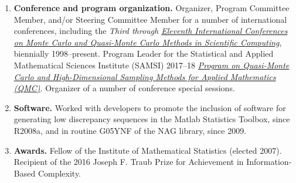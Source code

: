 \documentclass[11 pt]{NSFamsart}
\newcommand{\Matlab}{{\sc Matlab}\xspace}
\begin{document}
\begin{enumerate}
		\item \textbf{Conference and program organization.} Organizer, Program Committee Member, and/or Steering Committee Member for a number of international conferences, including the {\em Third through \href{http://mcqmc2018.inria.fr}{Eleventh
		International Conferences on Monte Carlo and
		Quasi-Monte Carlo Methods in Scientific Computing}}, biennially 1998--present.  Program 
		Leader for the Statistical and Applied Mathematical Sciences Institute (SAMSI) 
	2017--18 
	\href{https://www.samsi.info/programs-and-activities/year-long-research-programs/2017-18-program-quasi-monte-carlo-high-dimensional-sampling-methods-applied-mathematics-qmc/
		}{\emph{Program on Quasi-Monte Carlo and High-Dimensional Sampling Methods for Applied 
		Mathematics (QMC)}}.  Organizer of a number of conference special sessions.

		
		
		\item \textbf{Software.} Worked with developers to promote the inclusion of software for generating low 
		discrepancy sequences in the \Matlab Statistics Toolbox, since R2008a, and in routine 
		G05YNF of the NAG library, since 2009.
		
			    \item \textbf{Awards.} Fellow of the Institute of Mathematical Statistics (elected 2007).  Recipient of the 
			    2016 
		Joseph F. Traub Prize for Achievement in Information-Based 
		Complexity.
		
		

		

\end{enumerate}
\end{document}
